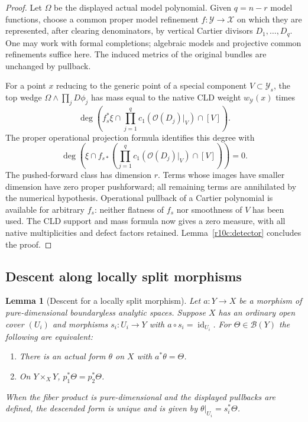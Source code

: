 \documentclass[11pt]{article}
\newtheorem{lemma}[theorem]{Lemma}
\theoremstyle{definition}
\theoremstyle{remark}
\numberwithin{equation}{section}
\begin{document}
\begin{proof}
Let $\Omega$ be the displayed actual model polynomial.  Given $q=n-r$
model functions, choose a common proper model refinement
$f:\mathcal Y\to\mathcal X$ on which they are represented, after
clearing denominators, by vertical Cartier divisors $D_1,\ldots,D_q$.
One may work with formal completions; algebraic models and projective
common refinements suffice here.  The induced metrics of the original
bundles are unchanged by pullback.

For a point $x$ reducing to the generic point of a special component
$V\subset\mathcal Y_s$, the top wedge
$\Omega\wedge\prod_jD\phi_j$ has mass equal to the native CLD weight
$w_{\mathcal Y}(x)$ times
\[
 \deg\left(f_s^*\xi\cap
       \prod_{j=1}^{q}c_1(\mathcal O(D_j)|_V)\cap[V]\right).
\]
The proper operational projection formula identifies this degree with
\[
 \deg\left(\xi\cap f_{s*}
       \left(\prod_{j=1}^{q}c_1(\mathcal O(D_j)|_V)\cap[V]\right)\right)=0.
\]
The pushed-forward class has dimension $r$.  Terms whose images have
smaller dimension have zero proper pushforward; all remaining terms are
annihilated by the numerical hypothesis.  Operational pullback of a
Cartier polynomial is available for arbitrary $f_s$: neither flatness of
$f_s$ nor smoothness of $V$ has been used.  The CLD support and mass
formula now gives a zero measure, with all native multiplicities and
defect factors retained.  Lemma~\ref{r10c:detector} concludes the proof.
\end{proof}

\subsection{Descent along locally split morphisms}

\begin{lemma}[Descent for a locally split morphism]
\label{r10c:split-descent}
Let $a:Y\to X$ be a morphism of pure-dimensional boundaryless analytic
spaces.  Suppose $X$ has an ordinary open cover $(U_i)$ and morphisms
$s_i:U_i\to Y$ with $a\circ s_i=\operatorname{id}_{U_i}$.
For $\Theta\in\mathcal B(Y)$ the following are equivalent:
\begin{enumerate}
\item There is an actual form $\theta$ on $X$ with $a^*\theta=\Theta$.
\item On $Y\times_XY$, $p_1^*\Theta=p_2^*\Theta$.
\end{enumerate}
When the fiber product is pure-dimensional and the displayed pullbacks
are defined, the descended form is unique and is given by
$\theta|_{U_i}=s_i^*\Theta$.
\end{lemma}
\end{document}
